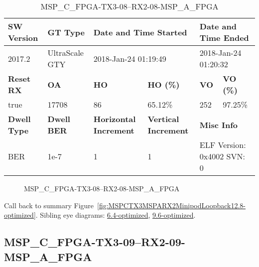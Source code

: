 \begin{table}[h]
\centering
\caption{MSP\_C\_FPGA-TX3-08--RX2-08-MSP\_A\_FPGA}
\label{tab:MSPCFPGATX308RX208MSPAFPGA12.8-optimized}
\begin{tabular}{@{}|l|l|l|l|l|l|@{}}
\toprule
\textbf{SW Version}                & \textbf{GT Type}   & \multicolumn{2}{l|}{\textbf{Date and Time Started}}            & \multicolumn{2}{l|}{\textbf{Date and Time Ended}}        \\ \midrule
2017.2                       & UltraScale GTY          & \multicolumn{2}{l|}{2018-Jan-24 01:19:49}                   & \multicolumn{2}{l|}{2018-Jan-24 01:20:32}               \\ \midrule
\textbf{Reset RX}                  & \textbf{OA} & \textbf{HO}   & \textbf{HO (\%)} & \textbf{VO} & \textbf{VO (\%)} \\ \midrule
true & 17708        & 86          & 65.12\%        & 252        & 97.25\%       \\ \midrule
\textbf{Dwell Type}                & \textbf{Dwell BER} & \textbf{Horizontal Increment} & \textbf{Vertical Increment}    & \multicolumn{2}{l|}{\textbf{Misc Info}}                  \\ \midrule
BER                            & 1e-7        & 1        & 1           & \multicolumn{2}{l|}{ELF Version: 0x4002 SVN: 0}                         \\ \bottomrule
\end{tabular}
\end{table}

\begin{figure}[h]
\caption{MSP\_C\_FPGA-TX3-08--RX2-08-MSP\_A\_FPGA} \label{fig:MSPCFPGATX308RX208MSPAFPGA12.8-optimized}
\end{figure}

Call back to summary Figure~\ref{fig:MSPCTX3MSPARX2MinipodLoopback12.8-optimized}.
Sibling eye diagrams: \hyperref[sec:MSPCFPGATX308RX208MSPAFPGA6.4-optimized]{6.4-optimized}, \hyperref[sec:MSPCFPGATX308RX208MSPAFPGA9.6-optimized]{9.6-optimized}.

\clearpage
\newpage


\subsection{MSP\_C\_FPGA-TX3-09--RX2-09-MSP\_A\_FPGA}\label{sec:MSPCFPGATX309RX209MSPAFPGA12.8-optimized}

